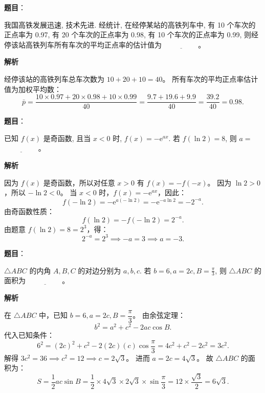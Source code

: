 \begin{answer}

\textbf{题目}：

我国高铁发展迅速, 技术先进. 经统计, 在经停某站的高铁列车中, 有 10 个车次的正点率为 0.97, 有 20 个车次的正点率为 0.98, 有 10 个车次的正点率为 0.99, 则经停该站高铁列车所有车次的平均正点率的估计值为 $\underline{\hspace{2cm}}$。

\textbf{解析}

经停该站的高铁列车总车次数为 $10 + 20 + 10 = 40$。
所有车次的平均正点率估计值为加权平均数：
\nopagebreak[4]
\[\bar{p} = \frac{10 \times 0.97 + 20 \times 0.98 + 10 \times 0.99}{40} = \frac{9.7 + 19.6 + 9.9}{40} = \frac{39.2}{40} = 0.98.\]


\end{answer}
\begin{answer}

\textbf{题目}：

已知 $f(x)$ 是奇函数, 且当 $x < 0$ 时, $f(x) = -\mathrm{e}^{ax}$. 若 $f(\ln 2) = 8$, 则 $a =$ $\underline{\hspace{2cm}}$。

\textbf{解析}

因为 $f(x)$ 是奇函数，所以对任意 $x > 0$ 有 $f(x) = -f(-x)$。
因为 $\ln 2 > 0$，所以 $-\ln 2 < 0$。
当 $x < 0$ 时，$f(x) = -\mathrm{e}^{ax}$，因此：
\nopagebreak[4]
\[f(-\ln 2) = -\mathrm{e}^{a(-\ln 2)} = -\mathrm{e}^{-a\ln 2} = -2^{-a}.\]
由奇函数性质：
\nopagebreak[4]
\[f(\ln 2) = -f(-\ln 2) = 2^{-a}.\]
由题意 $f(\ln 2) = 8 = 2^3$，得：
\nopagebreak[4]
\[2^{-a} = 2^3 \implies -a = 3 \implies a = -3.\]


\end{answer}
\begin{answer}

\textbf{题目}：

$\triangle ABC$ 的内角 $A, B, C$ 的对边分别为 $a, b, c$. 若 $b = 6, a = 2c, B = \frac{\pi}{3}$, 则 $\triangle ABC$ 的面积为 $\underline{\hspace{2cm}}$。

\textbf{解析}

在 $\triangle ABC$ 中，已知 $b = 6, a = 2c, B = \dfrac{\pi}{3}$。
由余弦定理：
\nopagebreak[4]
\[b^2 = a^2 + c^2 - 2ac\cos B.\]
代入已知条件：
\nopagebreak[4]
\[6^2 = (2c)^2 + c^2 - 2(2c)(c)\cos\frac{\pi}{3} = 4c^2 + c^2 - 2c^2 = 3c^2.\]
解得 $3c^2 = 36 \implies c^2 = 12 \implies c = 2\sqrt{3}$。
进而 $a = 2c = 4\sqrt{3}$。
故 $\triangle ABC$ 的面积为：
\nopagebreak[4]
\[S = \frac{1}{2}ac\sin B = \frac{1}{2} \times 4\sqrt{3} \times 2\sqrt{3} \times \sin\frac{\pi}{3} = 12 \times \frac{\sqrt{3}}{2} = 6\sqrt{3}.\]


\end{answer}
